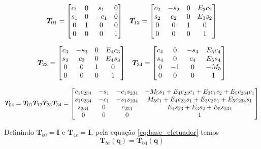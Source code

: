 \begin{align*}
\bm{T}_{01} = 
\begin{bmatrix}c_1 & 0 & s_1 &  0 \\
   s_1 & 0 & -c_1 & 0 \\
   0   & 1 &    0 & 0 \\
   0   & 0 &    0 & 1\end{bmatrix}
& &
\bm{T}_{12} =  \begin{bmatrix}c_2 & -s_2 &  0 & E_3 c_2 \\
   s_2 &  c_2 &  0 & E_3 s_2  \\
   0   &    0 &  1 & 	   0  \\
   0   &    0 &  0 &       1\end{bmatrix} 
\end{align*}

\begin{align*}
\bm{T}_{23} = 
\begin{bmatrix}c_3 & -s_3 &  0 & E_4 c_3 \\
   s_3 &  c_3 &  0 & E_4 s_3  \\
   0   &    0 &  1 & 	   0  \\
   0   &    0 &  0 &       1\end{bmatrix}
& &
\bm{T}_{34} = 
\begin{bmatrix}c_4 &    0 &  -s_4 & E_5 c_4 \\
   s_4 &    0 &   c_4 & E_5 s_4 \\
   0   &   -1 &     0 & 	-M_5 \\
   0   &    0 &     0 &       1\end{bmatrix}
\end{align*}


\begin{equation} \label{eq:cine_direta}
 \bm{T}_{04} = \bm{T}_{01} \bm{T}_{12}  \bm{T}_{23} \bm{T}_{34} = 
\begin{bmatrix}
   c_1 c_{234} & -s_1 & -c_1 s_{234} & -M_5 s_1 + E_4 c_{23}c_1 + E_3 c_1 c_2 + E_5 c_{234} c_1 \\
   s_1 c_{234} & -c_1 & -s_1 s_{234} &   M_5 c_1+E_4 c_{23} s_1 + E_3 c_2 s_1 + E_5 c_{234} s_1 \\
   s_{234}     &    0 &      c_{234} &					     E_4 s_{23} + E_3 s_2 + E_5 s_{234} \\
   0   &    0 &     0 &      												   1
\end{bmatrix} 
\end{equation}

Definindo $\bm{T}_{b0} = \bm{I}$ e $\bm{T}_{4e} = \bm{I}$, pela equação \eqref{eq:base_efetuador} temos
\begin{equation}
\bm{T}_{be} (\bm{q}) = \bm{T}_{04}(\bm{q})
\end{equation}


